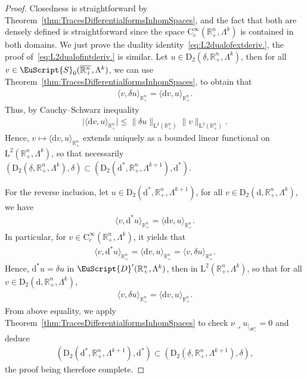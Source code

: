 \documentclass[AHL,Unicode,longabstracts,published]{cedram}
\newcommand{\bbR}{\mathbb{R}}
\newcommand{\rmd}{\mathrm{d}}
\newcommand{\rmD}{\mathrm{D}}
\newcommand{\rmL}{\mathrm{L}}
\newcommand{\rmC}{\mathrm{C}}
\newcommand{\eus}{\EuScript}
\newcommand{\iprod}{\mathbin{\lrcorner}}
\begin{document}
\begin{proof}
Closedness is straightforward by Theorem~\ref{thm:TracesDifferentialformsInhomSpaces}, and the fact that both are densely defined is straightforward since the space $\rmC _c^\infty(\bbR^n_+,\Lambda^k)$ is contained in both domains. We just prove the duality identity~\eqref{eq:L2dualofextderiv.}, the proof of~\eqref{eq:L2dualofintderiv.} is similar. Let $u\in \rmD_2(\underline{\delta},\bbR^n_+,\Lambda^{k})$, then for all $v\in\eus{S}_0(\overline{\bbR^n_+},\Lambda^k)$, we can use Theorem~\ref{thm:TracesDifferentialformsInhomSpaces}, to obtain that
\begin{align*}
\big\langle v, \delta u \big\rangle_{\bbR^n_+} = \big\langle \rmd v, u \big\rangle_{\bbR^n_+} .
\end{align*}
Thus, by Cauchy--Schwarz inequality
\begin{align*}
\big|\big\langle \rmd v, u \big\rangle_{\bbR^n_+}\big| \leqslant \| \delta u\|_{\rmL^2\left(\bbR^n_+\right)} \| v\|_{\rmL^2\left(\bbR^n_+\right)}.
\end{align*}
Hence, $v\mapsto \langle \rmd v, u \rangle_{\bbR^n_+}$ extends uniquely as a bounded linear functional on $\rmL^2(\bbR^n_+,\Lambda^{k})$, so that necessarily $(\rmD_2(\underline{\delta},\bbR^n_+,\Lambda^{k}),\delta)\subset (\rmD_2(\rmd^\ast,\bbR^n_+,\Lambda^{k+1}),\rmd^\ast)$.

For the reverse inclusion, let $u\in \rmD_2(\rmd^\ast,\bbR^n_+,\Lambda^{k+1})$, for all $v\in \rmD_2(\rmd,\bbR^n_+,\Lambda^{k})$, we have
\begin{align*}
\big\langle v, \rmd^{\ast} u \big\rangle_{\bbR^n_+} = \big\langle \rmd v, u \big\rangle_{\bbR^n_+} .
\end{align*}
In particular, for $v\in\rmC_c^\infty(\bbR^n_+,\Lambda^k)$, it yields that
\begin{align*}
\big\langle v, \rmd^{\ast} u \big\rangle_{\bbR^n_+} = \big\langle \rmd v, u \big\rangle_{\bbR^n_+} = \big\langle v, \delta u \big\rangle_{\bbR^n_+} .
\end{align*}
Hence, $\rmd^{\ast} u = \delta u$ in $\eus{D}'(\bbR^n_+,\Lambda^{k})$, then in $\rmL^2(\bbR^n_+,\Lambda^{k})$, so that for all $v\in \rmD_2(\rmd,\bbR^n_+,\Lambda^{k})$,
\begin{align*}
\big\langle v, \delta u \big\rangle_{\bbR^n_+} = \big\langle \rmd v, u \big\rangle_{\bbR^n_+} .
\end{align*}
From above equality, we apply Theorem~\ref{thm:TracesDifferentialformsInhomSpaces} to check $\nu\iprod u_{|_{\partial\bbR^n_+}}=0$ and deduce
\begin{align*}
\left(\rmD_2\left(\rmd^\ast,\bbR^n_+,\Lambda^{k+1}\right),\rmd^\ast\right)\subset\left(\rmD_2\left(\underline{\delta},\bbR^n_+,\Lambda^{k+1}\right),\delta\right),
\end{align*}
the proof being therefore complete.
\end{proof}
\end{document}
